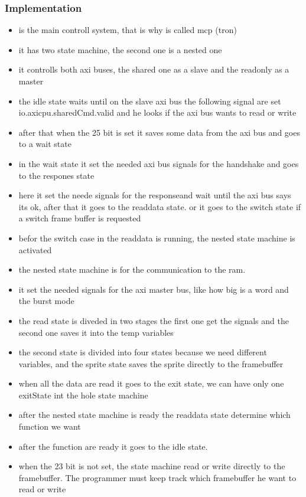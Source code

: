 \subsubsection*{Implementation}
\begin{itemize}
	\item is the main controll system, that is why is called mcp (tron)
	\item it has two state machine, the second one is a nested one
	\item it controlls both axi buses, the shared one as a slave and the readonly as a master
	\item the idle state waits until on the slave axi bus the following signal are set io.axicpu.sharedCmd.valid and he looks if the axi bus wants to read or write
	\item after that when the 25 bit is set it saves some data from the axi bus and goes to a wait state
	\item in the wait state it set the needed axi bus signals for the handshake and goes to the respones state
	\item here it set the neede signals for the responseand wait until the axi bus says its ok, after that it goes to the readdata state. or it goes to the switch state if a switch frame buffer is requested
	\item befor the switch case in the readdata is running, the nested state machine is activated
	\item the nested state machine is for the communication to the ram.
	\item it set the needed signals for the axi master bus, like how big is a word and the burst mode
	\item the read state is diveded in two stages the first one get the signals and the second one saves it into the temp variables
	\item the second state is divided into four states because we need different variables, and the sprite state saves the sprite directly to the framebuffer
	\item when all the data are read it goes to the exit state, we can have only one exitState int the hole state machine
	\item after the nested state machine is ready the readdata state determine which function we want
	\item after the function are ready it goes to the idle state.
	\item when the 23 bit is not set, the state machine read or write directly to the framebuffer. The programmer must keep track which framebuffer he want to read or write
\end{itemize}